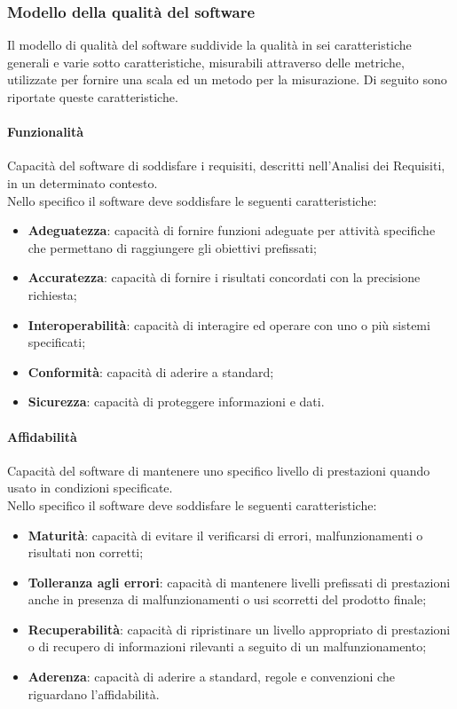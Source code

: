 		\subsubsection{Modello della qualità del software}
		Il modello di qualità del software suddivide la qualità in sei caratteristiche generali e varie sotto caratteristiche, misurabili attraverso delle metriche, utilizzate per fornire una scala ed un metodo per la misurazione. Di seguito sono riportate queste caratteristiche.

		\paragraph{Funzionalità}
		Capacità del software di soddisfare i requisiti, descritti nell'Analisi dei Requisiti, in un determinato contesto.\\
		Nello specifico il software deve soddisfare le seguenti caratteristiche:
		\begin{itemize}
			\item \textbf{Adeguatezza}: capacità di fornire funzioni adeguate per attività specifiche che permettano di raggiungere gli obiettivi prefissati;
			\item \textbf{Accuratezza}: capacità di fornire i risultati concordati con la precisione richiesta;
			\item \textbf{Interoperabilità}: capacità di interagire ed operare con uno o più sistemi specificati;
			\item \textbf{Conformità}: capacità di aderire a standard;
			\item \textbf{Sicurezza}: capacità di proteggere informazioni e dati.
		\end{itemize}
		\paragraph{Affidabilità}
		Capacità del software di mantenere uno specifico livello di prestazioni quando usato in condizioni specificate.\\
		Nello specifico il software deve soddisfare le seguenti caratteristiche:
		\begin{itemize}
			\item \textbf{Maturità}: capacità di evitare il verificarsi di errori, malfunzionamenti o risultati non corretti;
			\item \textbf{Tolleranza agli errori}: capacità di mantenere livelli prefissati di prestazioni anche in presenza di malfunzionamenti o usi scorretti del prodotto finale;
			\item \textbf{Recuperabilità}: capacità di ripristinare un livello appropriato di prestazioni o di recupero di informazioni rilevanti a seguito di un malfunzionamento;
			\item \textbf{Aderenza}:  capacità di aderire a standard, regole e convenzioni che riguardano l'affidabilità.
		\end{itemize}

